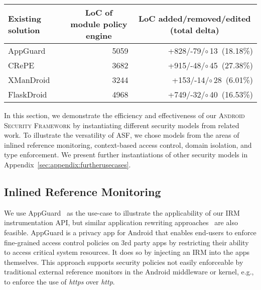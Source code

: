 \documentclass[letterpaper,twocolumn,10pt]{article}
\newcommand{\OURNAME}{\textsc{Android Security Framework}\xspace}
\newcommand{\OURSHORT}{\textsc{ASF}\xspace}
\begin{document}
\begin{table*}[t]
  \centering
\footnotesize
  \begin{tabular}{|l|r|r|}\hline
    \textbf{Existing solution} & \multicolumn{1}{|c|}{\textbf{LoC of module policy engine}} & \multicolumn{1}{|c|}{\textbf{LoC added/removed/edited (total delta)}} \\\hline
AppGuard~\cite{backes13TACAS} & 5059 & +828/-79/$\circ$\,13~(18.18\%) \\\hline
CRePE~\cite{CoNgCr_10:CRePE} & 3682 & +915/-48/$\circ$\,45~(27.38\%) \\\hline
XManDroid~\cite{BuDaDm_12:TowardsT} & 3244 & +153/-14/$\circ$\,28~(6.01\%) \\\hline
FlaskDroid~\cite{TUD-CS-2013-0115} & 4968 & +749/-32/$\circ$\,40~(16.53\%) \\\hline
  \end{tabular}
  \caption{Effort of porting different security extensions as module on our \OURNAME.}
  \label{tab:usecase:codediff}
\end{table*}


In this section, we demonstrate the efficiency and effectiveness of our \OURNAME by instantiating different security models from related work. To illustrate the versatility of \OURSHORT, we chose models from the areas of inlined reference monitoring, context-based access control, domain isolation, and type enforcement. We present further instantiations of other security models in Appendix~\ref{sec:appendix:furtherusecases}.

\subsection{Inlined Reference Monitoring~\cite{backes13TACAS}}
\label{sec:usecase:appguard}

We use AppGuard~\cite{backes13TACAS} as the use-case to illustrate the applicability of our IRM instrumentation API, but similar application rewriting approaches~\cite{Jeon2012} are also feasible. AppGuard is a privacy app for Android that enables end-users to enforce fine-grained access control policies on 3rd party apps by restricting their ability to access critical system resources. It does so by injecting an IRM into the apps themselves. This approach supports security policies not easily enforceable by traditional external reference monitors in the Android middleware or kernel, e.g., to enforce the use of \emph{https} over \emph{http}.
\end{document}
